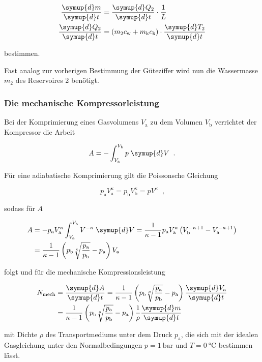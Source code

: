 \begin{align}
    \frac{\symup{d} m}{\symup{d}t} &= \frac{\symup{d} Q_2}{\symup{d}t} \cdot
    \frac{1}{L} \\
    \frac{\symup{d} Q_2}{\symup{d}t} &= (m_2 c_\text{w} + m_\text{k} c_\text{k})
    \cdot \frac{\symup{d} T_2}{\symup{d}t}
\end{align}

bestimmen.

Fast analog zur vorherigen Bestimmung der Güteziffer wird nun die Wassermasse
$m_2$ des Reservoires 2 benötigt.


\subsubsection{Die mechanische Kompressorleistung}

Bei der Komprimierung eines Gasvolumens $V_\text{a}$ zu dem Volumen $V_\text{b}$ 
verrichtet der Kompressor die Arbeit

\begin{equation}
    A = - \int^{V_\text{b}}_{V_\text{a}} p \; \symup{d}V \; \; \text{.}
\end{equation}

Für eine adiabatische Komprimierung gilt die Poissonsche Gleichung

\begin{equation}
    p_\text{a} V^\kappa_\text{a} = p_\text{b} V^\kappa_\text{b} = p V^\kappa \; \;
    \text{,}
\end{equation}

sodass für $A$ 

\begin{equation}
    \begin{split}
        A &= - p_\text{a} V^\kappa_\text{a} \int^{V_\text{b}}_{V_\text{a}} V^{-\kappa}
        \; \symup{d}V = \frac{1}{\kappa - 1} p_\text{a} V^\kappa_\text{a} \left(
        V^{-\kappa + 1}_\text{b} - V^{-\kappa + 1}_\text{a} \right) \\
        &= \frac{1}{\kappa - 1} \left(p_\text{b} \sqrt[\kappa]{
        \frac{p_\text{a}}{p_\text{b}}} - p_\text{a}\right) V_\text{a}
    \end{split}
\end{equation}

folgt und für die mechanische Kompressionsleistung

\begin{equation}
    \begin{split}
        N_\text{mech} &= \frac{\symup{d}A}{\symup{d}t} = \frac{1}{\kappa - 1}
        \left(p_\text{b} \sqrt[\kappa]{ \frac{p_\text{a}}{p_\text{b}}} 
        - p_\text{a} \right) \frac{\symup{d}V_\text{a}}{\symup{d}t} \\
        &= \frac{1}{\kappa - 1} \left(p_\text{b} \sqrt[\kappa]{ 
        \frac{p_\text{a}}{p_\text{b}}} - p_\text{a}\right) \frac{1}{\rho}
        \frac{\symup{d}m}{\symup{d}t}
    \end{split}
\end{equation}

mit Dichte $\rho$ des Transportmediums unter  dem Druck $p_\text{a}$, die sich
mit der idealen Gasgleichung unter den Normalbedingungen $p = \SI{1}{\bar}$ und
$T = \SI{0}{\celsius}$ bestimmen lässt.








